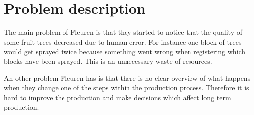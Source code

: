 \section{Problem description}
The main problem of Fleuren is that they started to notice that the quality of some fruit trees decreased due to human error. For instance  one block of trees would get sprayed twice because something went wrong when registering which blocks have been sprayed. This is an unnecessary waste of resources.

An other problem Fleuren has is that there is no clear overview of what happens when they change one of the steps within the production process. Therefore it is hard to improve the production and make decisions which affect long term production.